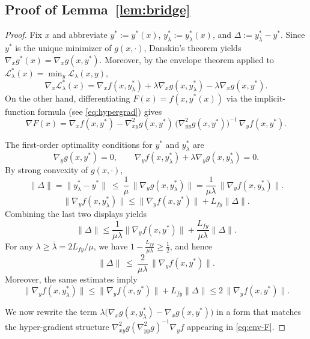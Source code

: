 \documentclass{article}
\newcommand{\1}{\mathbf{1}}
\begin{document}
\subsection{Proof of Lemma~\ref{lem:bridge}}\label{lem-bridgeeel}
\begin{proof}
Fix $x$ and abbreviate
$y^*:=y^*(x)$, $y_\lambda^*:=y_\lambda^*(x)$, and $\Delta:=y_\lambda^*-y^*$. Since $y^*$ is the unique minimizer of $g(x,\cdot)$, Danskin's theorem yields
$\nabla_x g^*(x)=\nabla_x g(x,y^*)$.
Moreover, by the envelope theorem applied to $\mathcal L_\lambda^{*}(x)=\min_y \mathcal L_\lambda(x,y)$,
\begin{equation}\label{eq:env-L}
\nabla_x \mathcal L_\lambda^{*}(x)
=
\nabla_x f(x,y_\lambda^*)
+\lambda\nabla_x g(x,y_\lambda^*)
-\lambda\nabla_x g(x,y^*).
\end{equation}
On the other hand, differentiating $F(x)=f(x,y^*(x))$ via the implicit-function formula
(see \eqref{eq:hypergrad}) gives
\begin{equation}\label{eq:env-F}
\nabla F(x)
=
\nabla_x f(x,y^*)
-
\nabla_{xy}^{2}g(x,y^*)\,\bigl(\nabla_{yy}^{2}g(x,y^*)\bigr)^{-1}\,\nabla_y f(x,y^*).
\end{equation}

The first-order optimality conditions for $y^*$ and $y_\lambda^*$ are
\[
\nabla_y g(x,y^*)=0,
\qquad
\nabla_y f(x,y_\lambda^*)+\lambda\nabla_y g(x,y_\lambda^*)=0.
\]
By strong convexity of $g(x,\cdot)$,
\[
\|\Delta\|
=\|y_\lambda^*-y^*\|
\ \le\ \frac{1}{\mu}\,\|\nabla_y g(x,y_\lambda^*)\|
=\frac{1}{\mu\lambda}\,\|\nabla_y f(x,y_\lambda^*)\|.
\]
\[
\|\nabla_y f(x,y_\lambda^*)\|
\le \|\nabla_y f(x,y^*)\| + L_{fy}\|\Delta\|.
\]
Combining the last two displays yields
\[
\|\Delta\|
\le
\frac{1}{\mu\lambda}\|\nabla_y f(x,y^*)\|
+\frac{L_{fy}}{\mu\lambda}\|\Delta\|.
\]
For any $\lambda\ge \bar\lambda=2L_{fy}/\mu$, we have $1-\frac{L_{fy}}{\mu\lambda}\ge \frac12$, and hence
\begin{equation}\label{eq:Delta-bound}
\|\Delta\|\ \le\ \frac{2}{\mu\lambda}\,\|\nabla_y f(x,y^*)\|.
\end{equation}
Moreover, the same estimates imply
\begin{equation}\label{eq:fy-at-ylam}
\|\nabla_y f(x,y_\lambda^*)\|
\le \|\nabla_y f(x,y^*)\| + L_{fy}\|\Delta\|
\le 2\,\|\nabla_y f(x,y^*)\|.
\end{equation}

We now rewrite the term
$\lambda\bigl(\nabla_x g(x,y_\lambda^{*})-\nabla_x g(x,y^{*})\bigr)$
in a form that matches the hyper-gradient structure
$\nabla_{xy}^{2}g(\nabla_{yy}^{2}g)^{-1}\nabla_y f$ appearing in \eqref{eq:env-F}.



\end{proof}
\end{document}

